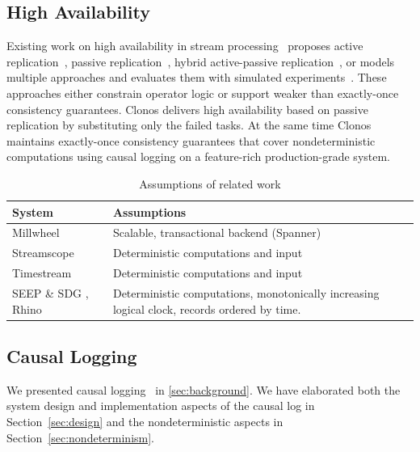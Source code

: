 \documentclass[sigconf]{acmart}
\begin{document}
\subsection{High Availability}

Existing work on high availability in stream processing~\cite{Hwang2005HAA} proposes active replication~\cite{BalazinskaBM05, Shah2004highly}, passive replication~\cite{HwangX07, KwonB08}, hybrid active-passive replication~\cite{HeinzeZ15, SuZ16}, or models multiple approaches and evaluates them with simulated experiments~\cite{ChandramouliG17, Hwang2005HAA}. These approaches either constrain operator logic or support weaker than exactly-once consistency guarantees.
Clonos delivers high availability based on passive replication by substituting only the failed tasks. At the same time Clonos maintains exactly-once consistency guarantees that cover nondeterministic computations using causal logging on a feature-rich production-grade system.


\begin{table}[t]
  \caption{Assumptions of related work}
  \label{tab:determinism-assumptions}
  \vspace{-2.5mm}
  \small
  \begin{tabular}{p{}|p{}}
      \toprule
      \textbf{System} & \textbf{Assumptions} \\
      \bottomrule\toprule
      Millwheel \cite{akidau2013millwheel} & Scalable, transactional backend (Spanner) \\ \hline
      Streamscope \cite{LinHZ16} & Deterministic computations and input \\\hline
      Timestream \cite{QianHS13} & Deterministic computations and input \\\hline
      SEEP \& SDG \cite{FernandezMK14}, Rhino \cite{delmonte2020rhino} & Deterministic computations, monotonically increasing logical clock, records ordered by time.\\\bottomrule
      \toprule
  \end{tabular}
\end{table}

\subsection{Causal Logging}

We presented causal logging~\cite{elnozahy1994manetho, elnozahy2002survey}  in \autoref{sec:background}. 
We have elaborated both the system design and implementation aspects of the causal log in Section~\ref{sec:design} and the nondeterministic aspects in Section~\ref{sec:nondeterminism}.
\end{document}
